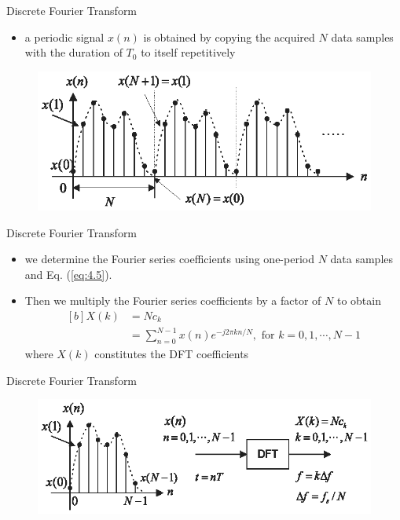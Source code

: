 \documentclass[pdflatex,compress,mathserif]{beamer}
\begin{document}
\begin{frame}{Discrete Fourier Transform}
    \begin{itemize}
        \item a periodic signal $x(n)$ is obtained by copying the acquired $N$ data samples with the duration of $T_0$ to itself repetitively
    \end{itemize}
    \begin{figure}
        \includegraphics[width=\linewidth]{fig/fig.4.06b}
    \end{figure}
\end{frame}

\begin{frame}{Discrete Fourier Transform}
    \begin{itemize}
        \item we determine the Fourier series coefficients using one-period $N$ data samples
        and Eq. (\ref{eq:4.5}).
        \item Then we multiply the Fourier series coefficients by a factor of $N$ to obtain
        \begin{equation}
            \begin{aligned}[b]
                X(k) &= Nc_k \\
                &= \sum_{n=0}^{N-1} x(n)e^{-j2\pi kn / N},\text{ for } k = 0,1, \cdots, N-1
            \end{aligned}
        \end{equation}
        where $X(k)$ constitutes the DFT coefficients
    \end{itemize}
\end{frame}

\begin{frame}{Discrete Fourier Transform}
    \begin{figure}
        \includegraphics[width=\linewidth]{fig/fig.4.06c}
    \end{figure}
\end{frame}
\end{document}
